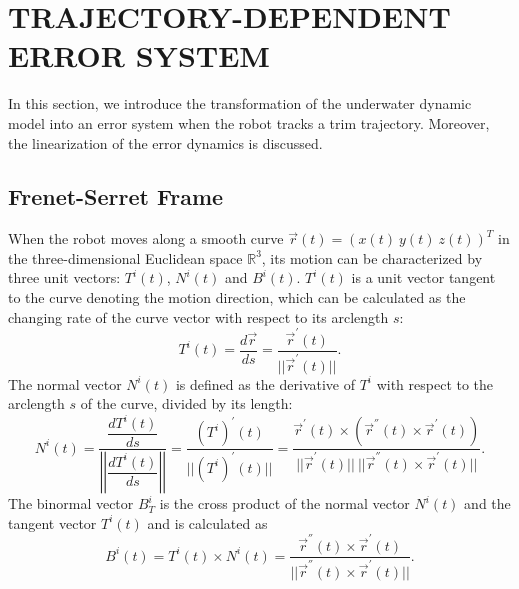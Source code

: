 
\section{TRAJECTORY-DEPENDENT ERROR SYSTEM}
In this section, we introduce the transformation of the underwater dynamic model into an error system when the robot tracks a trim trajectory. Moreover, the linearization of the error dynamics is discussed.
 
\subsection{Frenet-Serret Frame}
When the robot moves along a smooth curve $\vec{r}(t)=(x(t)~y(t)~z(t))^{T}$ in the three-dimensional Euclidean space $\mathbb{R}^{3}$, its motion can be characterized by three unit vectors: $T^{i}(t)$, $N^{i}(t)$ and $B^{i}(t)$. $T^{i}(t)$ is a unit vector tangent to the curve denoting the motion direction, which can be calculated as the changing rate of the curve vector with respect to its arclength $s$:
\begin{equation}
T^{i}(t)=\dfrac{d\vec{r}}{ds}=\frac{\vec{r}^{'}(t)}{||\vec{r}^{'}(t)||}.
\end{equation}
The normal vector $N^{i}(t)$ is defined as the derivative of $T^{i}$  with respect to the arclength $s$ of the curve, divided by its length:
\begin{equation}
N^{i}(t)=\dfrac{\dfrac{dT^{i}(t)}{ds}}{\left|\left|\dfrac{dT^{i}(t)}{ds}\right|\right|}=\dfrac{(T^{i})^{'}(t)}{||(T^{i})^{'}(t)||}=\dfrac{\vec{r}^{'}(t)\times (\vec{r}^{''}(t)\times \vec{r}^{'}(t))}{||\vec{r}^{'}(t)||~||\vec{r}^{''}(t)\times \vec{r}^{'}(t)||}.
\end{equation}
The binormal vector $B^{i}_{T}$ is the cross product of the normal vector $N^{i}(t)$ and the tangent vector $T^{i}(t)$ and is calculated as 
\begin{equation}
B^{i}(t)=T^{i}(t)\times N^{i}(t)=\frac{\vec{r}^{''}(t)\times \vec{r}^{'}(t)}{||\vec{r}^{''}(t)\times \vec{r}^{'}(t)||}.
\end{equation}
